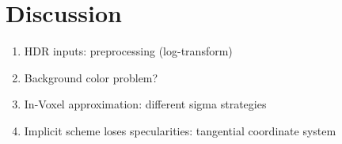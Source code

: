 





\section{Discussion}

\begin{enumerate}
    \item HDR inputs: preprocessing (log-transform)
    \item Background color problem?
    \item In-Voxel approximation: different sigma strategies
    \item Implicit scheme loses specularities: tangential coordinate system
\end{enumerate}
















